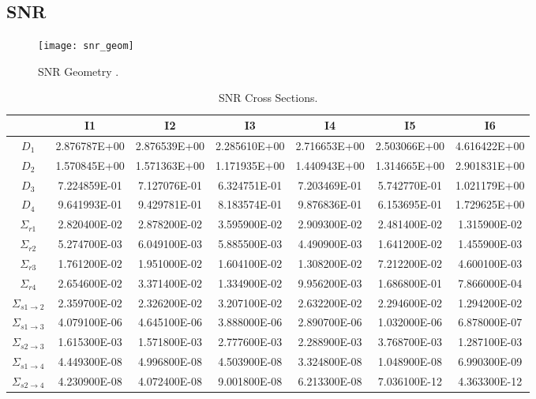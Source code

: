   \subsection{SNR}
    \begin{figure}
      \centering
      \texttt{[image: snr\_geom]}
      \caption{SNR Geometry \cite{argonneBenchmark}.}
      \label{fig:snr_geom}
    \end{figure}
    \begin{table}
      \caption{SNR Cross Sections.}
      \label{tab:snrxs}
      \begin{center}
        \begin{tabular}{ccccccc}
          \toprule
          &I1&I2&I3&I4&I5&I6\\
          \midrule
          $D_1$&2.876787E+00&2.876539E+00&2.285610E+00&2.716653E+00&2.503066E+00&4.616422E+00\\
          $D_2$&1.570845E+00&1.571363E+00&1.171935E+00&1.440943E+00&1.314665E+00&2.901831E+00\\
          $D_3$&7.224859E-01&7.127076E-01&6.324751E-01&7.203469E-01&5.742770E-01&1.021179E+00\\
          $D_4$&9.641993E-01&9.429781E-01&8.183574E-01&9.876836E-01&6.153695E-01&1.729625E+00\\
          $\Sigma_{r1}$&2.820400E-02&2.878200E-02&3.595900E-02&2.909300E-02&2.481400E-02&1.315900E-02\\
          $\Sigma_{r2}$&5.274700E-03&6.049100E-03&5.885500E-03&4.490900E-03&1.641200E-02&1.455900E-03\\
          $\Sigma_{r3}$&1.761200E-02&1.951000E-02&1.604100E-02&1.308200E-02&7.212200E-02&4.600100E-03\\
          $\Sigma_{r4}$&2.654600E-02&3.371400E-02&1.334900E-02&9.956200E-03&1.686800E-01&7.866000E-04\\
          $\Sigma_{s 1\rightarrow 2}$&2.359700E-02&2.326200E-02&3.207100E-02&2.632200E-02&2.294600E-02&1.294200E-02\\
          $\Sigma_{s 1\rightarrow 3}$&4.079100E-06&4.645100E-06&3.888000E-06&2.890700E-06&1.032000E-06&6.878000E-07\\
          $\Sigma_{s 2\rightarrow 3}$&1.615300E-03&1.571800E-03&2.777600E-03&2.288900E-03&3.768700E-03&1.287100E-03\\
          $\Sigma_{s 1\rightarrow 4}$&4.449300E-08&4.996800E-08&4.503900E-08&3.324800E-08&1.048900E-08&6.990300E-09\\
          $\Sigma_{s 2\rightarrow 4}$&4.230900E-08&4.072400E-08&9.001800E-08&6.213300E-08&7.036100E-12&4.363300E-12\\

\end{tabular}
\end{center}
\end{table}
